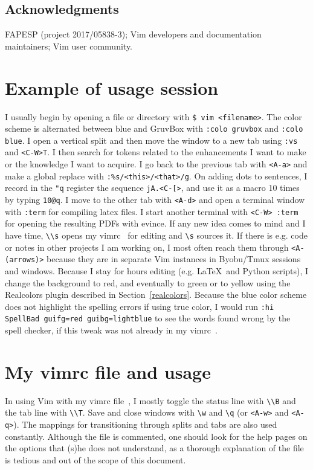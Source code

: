 \documentclass{article}
\newcommand{\ttt}[1] {
	\texttt{<#1>}}
\newcommand{\tttt}[1]{\texttt{#1}}
\begin{document}
\subsection*{Acknowledgments}
FAPESP (project 2017/05838-3); Vim developers and documentation maintainers;
Vim user community. 

\appendix
\section{Example of usage session}
I usually begin by opening a file or directory
with \tttt{\$ vim <filename>}.
The color scheme is alternated between
blue and GruvBox with
\tttt{:colo gruvbox} and \tttt{:colo blue}.
I open a vertical split and then move
the window to a new tab using
\tttt{:vs} and \tttt{<C-W>T}.
I then search for tokens related to
the enhancements I want to make or
the knowledge I want to acquire.
I go back to the previous tab with \ttt{A-a}
and make a global replace with
\tttt{:\%s/<this>/<that>/g}.
On adding dots to sentences,
I record in the \tttt{"q} register
the sequence \tttt{jA.<C-[>},
and use it as a macro 10 times by typing
\tttt{10@q}.
I move to the other tab with \ttt{A-d}
and open a terminal window with \tttt{:term}
for compiling latex files.
I start another terminal with \tttt{<C-W> :term}
for opening the resulting PDFs with evince.
If any new idea comes to mind and I have time,
\tttt{\textbackslash\textbackslash s} opens 
my vimrc~\cite{vimrc} for editing and \tttt{\textbackslash s}
sources it.
If there is e.g. code or notes in other projects I am working
on, I most often reach them through \tttt{<A-(arrows)>} because they
are in separate Vim instances
in Byobu/Tmux sessions and windows.
Because I stay for hours editing (e.g. \LaTeX\ and Python
scripts), I change the background to red, and eventually to green or to yellow using the Realcolors plugin described in Section~\ref{realcolors}.
Because the blue color scheme does not highlight the spelling errors
if using true color, I would run
\tttt{:hi SpellBad guifg=red guibg=lightblue}
to see the words found wrong by the spell checker,
if this tweak was not already in my vimrc~\cite{vimrc}.

\section{My vimrc file and usage}
In using Vim with my vimrc file~\cite{vimrc},
I mostly toggle the status line with \texttt{\textbackslash\textbackslash B}
and the tab line with \texttt{\textbackslash\textbackslash T}.
Save and close windows with \texttt{\textbackslash w} and \texttt{\textbackslash q}
(or \ttt{A-w} and \ttt{A-q}).
The mappings for transitioning through splits and tabs
are also used constantly.
Although the file is commented, one should
look for the help pages on the options that (s)he does
not understand, as a thorough explanation
of the file is tedious and out of the scope
of this document.
\end{document}
